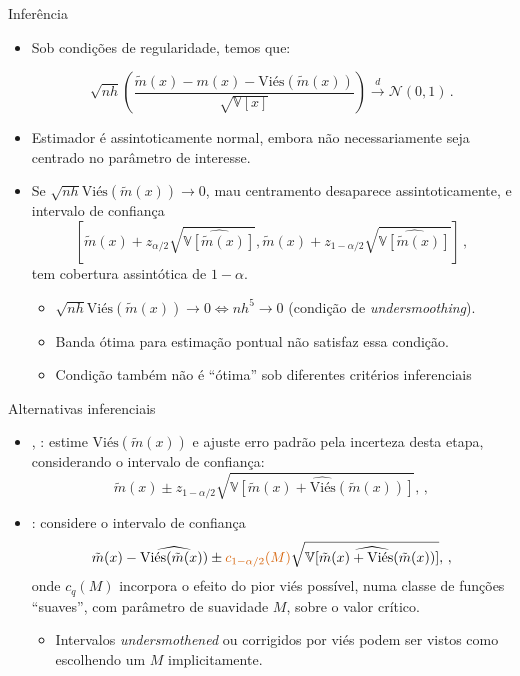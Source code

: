 \documentclass[11pt]{beamer}
\begin{document}
	\begin{frame}{Inferência}
	\begin{itemize}
		\item Sob condições de regularidade, temos que:
		
		$$\sqrt{nh}\left(\frac{\tilde{m}(x) - m(x)  - \text{Vi\'{e}s}(\tilde{m}(x)) }{\sqrt{\mathbb{V}[x]}}\right) \overset{d}{\to} \mathcal{N}(0,1) \, .$$
		\item Estimador é assintoticamente normal, embora não necessariamente seja centrado no parâmetro de interesse.
		\item Se $\sqrt{nh}\text{Vi\'{e}s}(\tilde{m}(x)) \to 0$, mau centramento desaparece assintoticamente, e intervalo de confiança $$[\tilde{m}(x) + z_{\alpha/2}\sqrt{\widehat{\mathbb{V}[\tilde{m}(x)]}}, \tilde{m}(x) + z_{1-\alpha/2}\sqrt{\widehat{\mathbb{V}[\tilde{m}(x)]}}]\,,$$ tem cobertura assintótica de $1-\alpha$.
		\begin{itemize}
			\item  $\sqrt{nh}\text{Vi\'{e}s}(\tilde{m}(x)) \to 0 \iff n h^5 \to 0$ (condição de \textit{undersmoothing}).
			\item Banda ótima para estimação pontual {\color{red}não} satisfaz essa condição.
			\item Condição também não é ``ótima'' sob diferentes critérios inferenciais \citep{armstrong2020simple,calonico2022coverage}
		\end{itemize}
	\end{itemize}
	\end{frame}
	\begin{frame}{Alternativas inferenciais}
	\begin{itemize}
		\item \citet{calonico2014robust}, \citet{calonico2018effect,calonico2022coverage}: estime $\text{Vi\'{e}s}(\tilde{m}(x))$ e ajuste erro padrão pela incerteza desta etapa, considerando o intervalo de confiança:
		 $$\tilde{m}(x) \pm z_{1- \alpha/2}\sqrt{\widehat{\mathbb{V}[\tilde{m}(x) +\text{Vi\'{e}s}(\tilde{m}(x))]}},\,,$$
		 \item \citet{armstrong2020simple}: considere o intervalo de confiança
		 	 $$\tilde{m}(x)- \widehat{\text{Vi\'{e}s}(\tilde{m}(x))} \pm {\color{red}c_{1- \alpha/2}(M)}\sqrt{\widehat{\mathbb{V}[\tilde{m}(x) +\text{Vi\'{e}s}(\tilde{m}(x))]}},\,,$$
		 	 onde $c_q(M)$ incorpora o efeito do pior viés possível, numa classe de funções ``suaves'', com parâmetro de suavidade $M$, sobre o valor crítico.
		 	 \begin{itemize}
		 	 	\item Intervalos \textit{undersmothened} ou corrigidos por viés podem ser vistos como escolhendo um $M$ implicitamente.
		 	 \end{itemize}
	\end{itemize}
	\end{frame}
	
\end{document}
